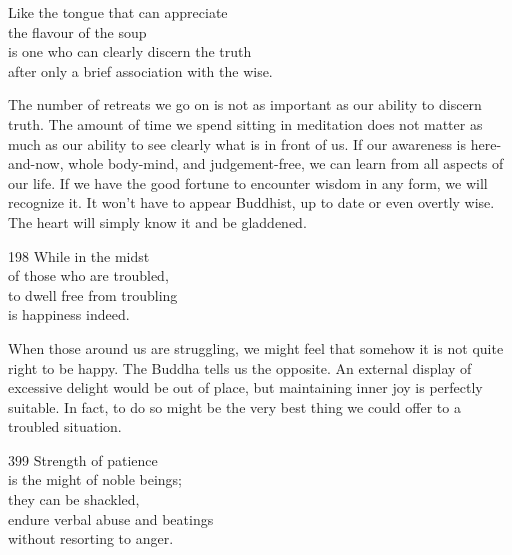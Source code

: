 \begin{dhpVerse}{65}
\label{dhp-65}
Like the tongue that can appreciate\\
the flavour of the soup\\
is one who can clearly discern the truth\\
after only a brief association with the wise.
\end{dhpVerse}

\begin{dhpRefl}
  The number of retreats we go on is not as important as our ability to discern
  truth. The amount of time we spend sitting in meditation does not matter as
  much as our ability to see clearly what is in front of us. If our awareness is
  here-and-now, whole body-mind, and judgement-free, we can learn from all
  aspects of our life. If we have the good fortune to encounter wisdom in any
  form, we will recognize it. It won't have to appear Buddhist, up to date or
  even overtly wise. The heart will simply know it and be gladdened.
\end{dhpRefl}


\begin{dhpVerse}{198}
\label{dhp-198}
While in the midst\\
of those who are troubled,\\
to dwell free from troubling\\
is happiness indeed.
\end{dhpVerse}

\begin{dhpRefl}
  When those around us are struggling, we might feel that somehow it is not
  quite right to be happy. The Buddha tells us the opposite. An external display
  of excessive delight would be out of place, but maintaining inner joy is
  perfectly suitable. In fact, to do so might be the very best thing we could
  offer to a troubled situation.
\end{dhpRefl}


\begin{dhpVerse}{399}
\label{dhp-399}
Strength of patience\\
is the might of noble beings;\\
they can be shackled,\\
endure verbal abuse and beatings\\
without resorting to anger.
\end{dhpVerse}

